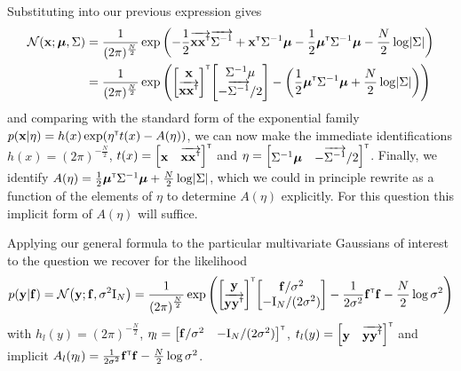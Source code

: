 \documentclass[a4paper]{article}
\theoremstyle{definition}
\begin{document}
Substituting into our previous expression gives
\begin{align}
\NormDist{\vx; \vmu, \Sigma} &= \frac{1}{(2 \pi)^\frac{N}{2}} \exp{\left(-\frac{1}{2} \overrightarrow {\vx \vx\transpose} \overrightarrow{\Sigma^{-1}} + \vx\transpose \Sigma^{-1} \vmu -\frac{1}{2}\vmu\transpose\Sigma^{-1}\vmu - \frac{N}{2}\log\detbar{\Sigma}\right)} \\
& =  \frac{1}{(2 \pi)^\frac{N}{2}} \exp{\left(\begin{bmatrix} \vx \\ \overrightarrow{\vx\vx\transpose}\end{bmatrix}\transpose \begin{bmatrix}\Sigma^{-1}\mu \\ -\overrightarrow{\Sigma^{-1}}/2\end{bmatrix} -\left(\frac{1}{2}\vmu\transpose\Sigma^{-1}\vmu + \frac{N}{2}\log\detbar{\Sigma}\right)\right)}
\end{align}
and comparing with the standard form of the exponential family $p(\mathbf{x}|\eta) = h(x) \exp(\eta^\mathrm{\textsf{\tiny T}} t(x) - A(\eta))$, we can now make the immediate identifications $h(x) = \left(2\pi\right)^{-\frac{N}{2}}$, $t(x) = \begin{bmatrix} \mathbf{x} & \overrightarrow{\mathbf{x}\mathbf{x}^\mathrm{\textsf{\tiny T}}}\end{bmatrix}^\mathrm{\textsf{\tiny T}}$ and $\eta = \begin{bmatrix} \Sigma^{-1}\boldsymbol{\mu} & -\overrightarrow{\Sigma^{-1}}/2\end{bmatrix}^\mathrm{\textsf{\tiny T}}$. Finally, we identify $A(\eta) = \frac{1}{2}\vmu\transpose\Sigma^{-1}\vmu + \frac{N}{2}\log\detbar{\Sigma}$, which we could in principle rewrite as a function of the elements of $\eta$ to determine $A(\eta)$ explicitly. For this question this implicit form of $A(\eta)$ will suffice.

Applying our general formula to the particular multivariate Gaussians of interest to the question we recover for the likelihood
\begin{equation}
p(\vy| \vf) = \NormDist{\vy; \vf, \sigma^2 \mathrm I_N} =  \frac{1}{\left( {2\pi}\right)^\frac{N}{2} } \exp{\left(\begin{bmatrix} \vy  \\ \overrightarrow{\vy\vy\transpose}\end{bmatrix}\transpose\begin{bmatrix} \vf/\sigma^2 \\ -\mathrm I_N/(2\sigma^2)\end{bmatrix} - \frac{1}{2\sigma^2} \vf\transpose\vf - \frac{N}{2} \log{\sigma^2} \right)}
\end{equation}
with $h_l(y) = \left(2\pi\right)^{-\frac{N}{2}}$,  $\eta_l = \begin{bmatrix} \mathbf{f}/\sigma^2 & -\mathrm I_N/(2\sigma^2)\end{bmatrix}^\mathrm{\textsf{\tiny T}}$, $t_l(y) = \begin{bmatrix} \mathbf{y} & \overrightarrow{\mathbf{y}\mathbf{y}^\mathrm{\textsf{\tiny T}}}\end{bmatrix}^\mathrm{\textsf{\tiny T}}$ and implicit $A_l(\eta_l) = \frac{1}{2\sigma^2} \mathbf{f}^\mathrm{\textsf{\tiny T}}\mathbf{f} -\frac{N}{2} \log{\sigma^2}$.
\end{document}
